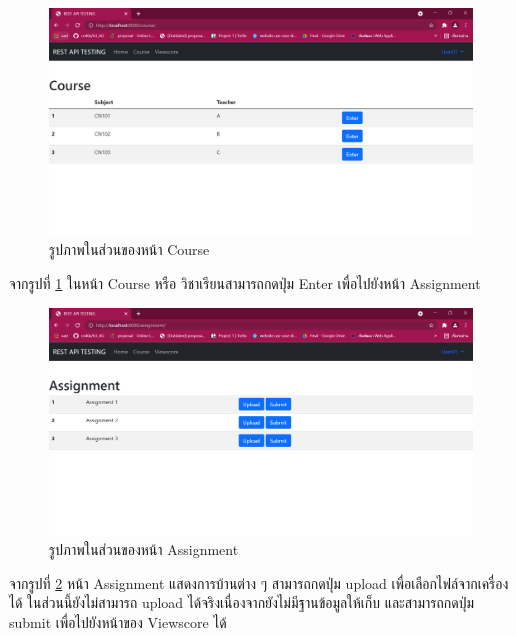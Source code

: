 \begin{figure}[!thb]
	\captionsetup{justification=centering}
	\centering
	\includegraphics[width=5in]{latex/figures/course.png}
	\caption{รูปภาพในส่วนของหน้า Course}
	\label{fig:coure}
\end{figure}
\noindent จากรูปที่ \ref{fig:coure} ในหน้า Course หรือ
วิชาเรียนสามารถกดปุ่ม Enter เพื่อไปยังหน้า Assignment

\begin{figure}[!thb]
	\captionsetup{justification=centering}
	\centering
	\includegraphics[width=5in]{latex/figures/assign.png}
	\caption{รูปภาพในส่วนของหน้า Assignment}
	\label{fig:assign}
\end{figure}
\noindent จากรูปที่ \ref{fig:assign} หน้า Assignment แสดงการบ้านต่าง ๆ สามารถกดปุ่ม upload เพื่อเลือกไฟล์จากเครื่องได้ ในส่วนนี้ยังไม่สามารถ upload ได้จริงเนื่องจากยังไม่มีฐานข้อมูลให้เก็บ และสามารถกดปุ่ม submit เพื่อไปยังหน้าของ Viewscore ได้
\newpage

